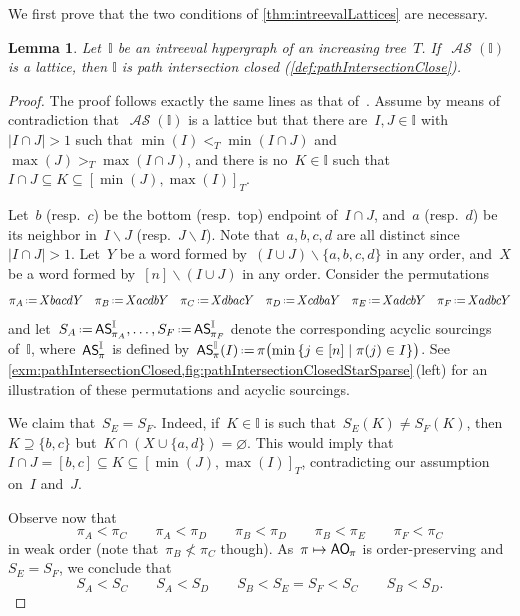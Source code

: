 \documentclass{amsart}
\newtheorem{lemma}[theorem]{Lemma}
\theoremstyle{definition}
\newcommand{\set}[2]{\left\{ #1 \;\middle|\; #2 \right\}} %
\newcommand{\ssm}{\smallsetminus} %
\newcommand{\eqdef}{\mbox{\,\raisebox{0.2ex}{\scriptsize\ensuremath{\mathrm:}}\ensuremath{=}\,}} %
\newcommand{\mymap}[2]{\mathsf{#1}_{\hspace{-.7pt}#2}}
\newcommand{\aorn}[1]{\mymap{AO}{#1}}  %
\DeclareMathOperator{\ASour}{\mathcal{AS}}  %
\newcommand{\asour}[1]{\mymap{AS}{#1}}  %
\newcommand{\II}{\mathbb I} %
\begin{document}
We first prove that the two conditions of \cref{thm:intreevalLattices} are necessary.

\begin{lemma}
\label{lem:pathIntersectionClosed}
Let~$\II$ be an intreeval hypergraph of an increasing tree~$T$.
If~$\ASour(\II)$ is a lattice, then $\II$ is path intersection closed (\cref{def:pathIntersectionClose}).
\end{lemma}

\begin{proof}
The proof follows exactly the same lines as that of~\cite[Prop.~4.6]{BergeronPilaud}.
Assume by means of contradiction that~$\ASour(\II)$ is a lattice but that there are~$I,J\in \II$ with~$|I\cap J|> 1$ such that $\min(I) <_T \min(I\cap J)$ and  $\max(J) >_T \max(I\cap J)$, and there is no~$K \in \II$ such that ${I \cap J \subseteq K \subseteq [\min(J) , \max(I)]_T}$.

Let~$b$ (resp.~$c$) be the bottom (resp.~top) endpoint of~$I \cap J$, and~$a$ (resp.~$d$) be its neighbor in~$I \ssm J$ (resp.~$J \ssm I$).
Note that~$a,b,c,d$ are all distinct since~$|I \cap J| > 1$.
Let~$Y$ be a word formed by~$(I \cup J) \ssm \{a,b,c,d\}$ in any order, and~$X$ be a word formed by~$[n] \ssm (I \cup J)$ in any order.
Consider the permutations
\[
\pi_A \eqdef XbacdY
\quad
\pi_B \eqdef XacdbY
\quad
\pi_C \eqdef XdbacY
\quad
\pi_D \eqdef XcdbaY
\quad
\pi_E \eqdef XadcbY
\quad
\pi_F \eqdef XadbcY
\]
and let~$S_A \eqdef \asour{\pi_A}^\II, \dots, S_F \eqdef \asour{\pi_F}^\II$ denote the corresponding acyclic sourcings of~$\II$, where~$\asour{\pi}^\II$ is defined by~$\asour{\pi}^\II(I) \eqdef \pi\bigl(\min \set{j \in [n]}{\pi(j) \in I} \bigr)$.
See \cref{exm:pathIntersectionClosed,fig:pathIntersectionClosedStarSparse}\,(left) for an illustration of these permutations and acyclic sourcings.

We claim that~$S_E = S_F$.
Indeed, if~$K \in \II$ is such that~$S_E(K) \ne S_F(K)$, then~$K \supseteq \{b,c\}$ but~${K \cap (X \cup \{a,d\}) = \varnothing}$.
This would imply that~${I \cap J = [b,c] \subseteq K \subseteq [\min(J) , \max(I)]_T}$, contradicting our assumption on~$I$ and~$J$.

Observe now that
\[
\pi_A < \pi_C
\qquad
\pi_A < \pi_D
\qquad
\pi_B < \pi_D
\qquad
\pi_B < \pi_E
\qquad
\pi_F < \pi_C
\]
in weak order (note that~$\pi_B \not< \pi_C$ though).
As~$\pi \mapsto \aorn{\pi}$ is order-preserving and~$S_E = S_F$, we conclude that
\[
S_A < S_C
\qquad
S_A < S_D
\qquad
S_B < S_E = S_F < S_C
\qquad
S_B < S_D.
\]


\end{proof}
\end{document}
